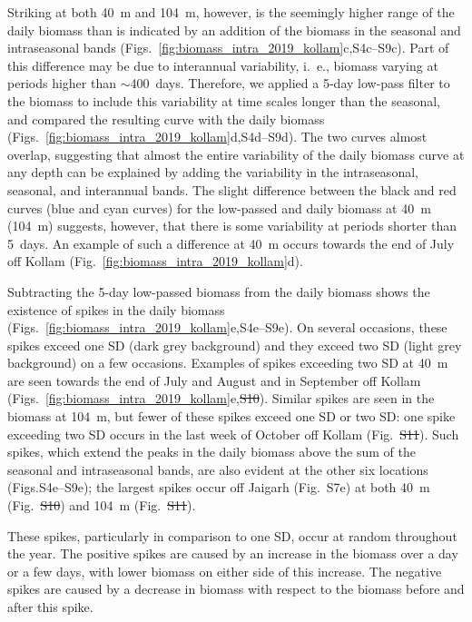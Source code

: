 \documentclass[authoryear,review,11pt]{elsarticle}
\providecommand{\DIFaddtex}[1]{{\protect\color{blue}\uwave{#1}}} %
\providecommand{\DIFdeltex}[1]{{\protect\color{red}\sout{#1}}}                      %
\providecommand{\DIFaddbegin}{} %
\providecommand{\DIFaddend}{} %
\providecommand{\DIFdelbegin}{} %
\providecommand{\DIFdelend}{} %
\providecommand{\DIFadd}[1]{\texorpdfstring{\DIFaddtex{#1}}{#1}} %
\providecommand{\DIFdel}[1]{\texorpdfstring{\DIFdeltex{#1}}{}} %
\begin{document}
Striking at both 40~m and 104~m, however, is the seemingly higher range of the daily biomass than is indicated by an addition of the biomass in the seasonal and intraseasonal bands (Figs.~\ref{fig:biomass_intra_2019_kollam}c,S4c--S9c). Part of this difference may be due to interannual variability, i.~e., biomass varying at periods higher than $\sim$400~days.  Therefore, we applied a 5-day low-pass filter to the biomass to include this variability at time scales longer than the seasonal, and compared the resulting curve with the daily biomass (Figs.~\ref{fig:biomass_intra_2019_kollam}d,S4d--S9d).  The two curves almost overlap, suggesting that almost the entire variability of the daily biomass curve at any depth can be explained by adding the variability in the intraseasonal, seasonal, and interannual bands. The slight difference between the black and red curves (blue and cyan curves) for the low-passed and daily biomass at 40~m (104~m) suggests, however, that there is some variability at periods shorter than 5~days.  An example of such a difference at 40~m occurs towards the end of July off Kollam (Fig.~\ref{fig:biomass_intra_2019_kollam}d).

Subtracting the 5-day low-passed biomass from the daily biomass shows the existence of spikes in the daily biomass (Figs.~\ref{fig:biomass_intra_2019_kollam}e,S4e--S9e).  On several occasions, these spikes exceed one SD (dark grey background) and they exceed two SD (light grey background) on a few occasions.  Examples of spikes exceeding two SD at 40~m are seen towards the end of July and August and in September off Kollam (Figs.~\ref{fig:biomass_intra_2019_kollam}e,\DIFdelbegin \DIFdel{S10}\DIFdelend \DIFaddbegin \DIFadd{S11}\DIFaddend ). Similar spikes are seen in the biomass at 104~m, but fewer of these spikes exceed one SD or two SD: one spike exceeding two SD occurs in the last week of October off Kollam (Fig.~\DIFdelbegin \DIFdel{S11}\DIFdelend \DIFaddbegin \DIFadd{S12}\DIFaddend ). Such spikes, which extend the peaks in the daily biomass above the sum of the seasonal and intraseasonal bands, are also evident at the other six locations (Figs.S4e--S9e); the largest spikes occur off Jaigarh (Fig.~S7e) at both 40~m (Fig.~\DIFdelbegin \DIFdel{S10}\DIFdelend \DIFaddbegin \DIFadd{S11}\DIFaddend ) and 104~m (Fig.~\DIFdelbegin \DIFdel{S11}\DIFdelend \DIFaddbegin \DIFadd{S12}\DIFaddend ).  

These spikes, particularly in comparison to one SD, occur at random throughout the year. The positive spikes are caused by an increase in the biomass over a day or a few days, with lower biomass on either side of this increase. The negative spikes are caused by a decrease in biomass with respect to the \DIFaddbegin \DIFadd{higher }\DIFaddend biomass before and after this spike.
\end{document}
